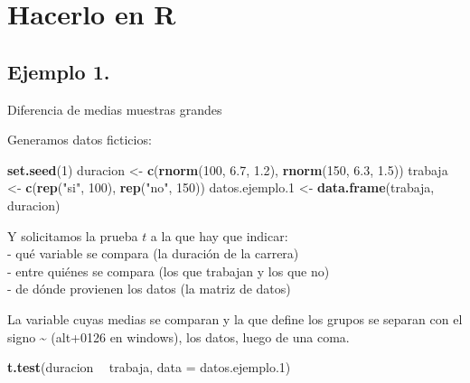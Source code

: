 \documentclass[]{book}
\newenvironment{Shaded}{\begin{snugshade}}{\end{snugshade}}
\newcommand{\DataTypeTok}[1]{\textcolor[rgb]{0.13,0.29,0.53}{#1}}
\newcommand{\DecValTok}[1]{\textcolor[rgb]{0.00,0.00,0.81}{#1}}
\newcommand{\FloatTok}[1]{\textcolor[rgb]{0.00,0.00,0.81}{#1}}
\newcommand{\KeywordTok}[1]{\textcolor[rgb]{0.13,0.29,0.53}{\textbf{#1}}}
\newcommand{\NormalTok}[1]{#1}
\newcommand{\OperatorTok}[1]{\textcolor[rgb]{0.81,0.36,0.00}{\textbf{#1}}}
\newcommand{\StringTok}[1]{\textcolor[rgb]{0.31,0.60,0.02}{#1}}
\begin{document}
\hypertarget{hacerlo-en-r-9}{%
\section{Hacerlo en R}\label{hacerlo-en-r-9}}

\hypertarget{ejemplo-1.}{%
\subsection{Ejemplo 1.}\label{ejemplo-1.}}

Diferencia de medias muestras grandes

Generamos datos ficticios:

\begin{Shaded}
\begin{Highlighting}[]
\KeywordTok{set.seed}\NormalTok{(}\DecValTok{1}\NormalTok{)}
\NormalTok{duracion <-}\StringTok{ }\KeywordTok{c}\NormalTok{(}\KeywordTok{rnorm}\NormalTok{(}\DecValTok{100}\NormalTok{, }\FloatTok{6.7}\NormalTok{, }\FloatTok{1.2}\NormalTok{), }\KeywordTok{rnorm}\NormalTok{(}\DecValTok{150}\NormalTok{, }\FloatTok{6.3}\NormalTok{, }\FloatTok{1.5}\NormalTok{))}
\NormalTok{trabaja <-}\StringTok{ }\KeywordTok{c}\NormalTok{(}\KeywordTok{rep}\NormalTok{(}\StringTok{"si"}\NormalTok{, }\DecValTok{100}\NormalTok{), }\KeywordTok{rep}\NormalTok{(}\StringTok{"no"}\NormalTok{, }\DecValTok{150}\NormalTok{))}
\NormalTok{datos.ejemplo}\FloatTok{.1}\NormalTok{ <-}\StringTok{ }\KeywordTok{data.frame}\NormalTok{(trabaja, duracion)}
\end{Highlighting}
\end{Shaded}

Y solicitamos la prueba \(t\) a la que hay que indicar:\\
- qué variable se compara (la duración de la carrera)\\
- entre quiénes se compara (los que trabajan y los que no)\\
- de dónde provienen los datos (la matriz de datos)

La variable cuyas medias se comparan y la que define los grupos se separan con el signo \textasciitilde{} (alt+0126 en windows), los datos, luego de una coma.

\begin{Shaded}
\begin{Highlighting}[]
\KeywordTok{t.test}\NormalTok{(duracion }\OperatorTok{~}\StringTok{ }\NormalTok{trabaja, }\DataTypeTok{data =}\NormalTok{ datos.ejemplo}\FloatTok{.1}\NormalTok{)}
\end{Highlighting}
\end{Shaded}
\end{document}
